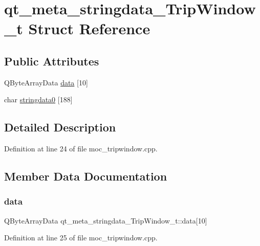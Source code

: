 \hypertarget{structqt__meta__stringdata___trip_window__t}{}\section{qt\+\_\+meta\+\_\+stringdata\+\_\+\+Trip\+Window\+\_\+t Struct Reference}
\label{structqt__meta__stringdata___trip_window__t}
\subsection*{Public Attributes}
\begin{DoxyCompactItemize}
\item 
Q\+Byte\+Array\+Data \mbox{\hyperlink{structqt__meta__stringdata___trip_window__t_a2302001ff3adf6b749e048f1fb6ca7e8}{data}} \mbox{[}10\mbox{]}
\item 
char \mbox{\hyperlink{structqt__meta__stringdata___trip_window__t_aa1be2cd8cbd427f3d07157097fb49920}{stringdata0}} \mbox{[}188\mbox{]}
\end{DoxyCompactItemize}


\subsection{Detailed Description}


Definition at line 24 of file moc\+\_\+tripwindow.\+cpp.



\subsection{Member Data Documentation}
\mbox{\label{structqt__meta__stringdata___trip_window__t_a2302001ff3adf6b749e048f1fb6ca7e8}} 
\subsubsection{\texorpdfstring{data}{data}}
{\footnotesize\ttfamily Q\+Byte\+Array\+Data qt\+\_\+meta\+\_\+stringdata\+\_\+\+Trip\+Window\+\_\+t\+::data\mbox{[}10\mbox{]}}



Definition at line 25 of file moc\+\_\+tripwindow.\+cpp.

